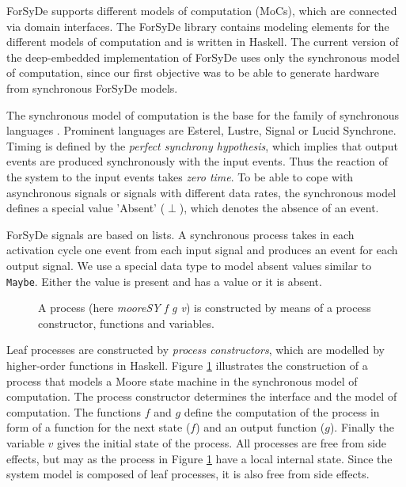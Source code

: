 ForSyDe supports different models of computation (MoCs), which are connected via domain interfaces. The ForSyDe library contains modeling elements for the different models of computation and is written in Haskell. The current version of the deep-embedded implementation of ForSyDe uses only the synchronous model of computation, since our first objective was to be able to generate hardware from synchronous ForSyDe models.

The synchronous model of computation is the base for the family of synchronous languages \cite{BenBer1991}. Prominent languages are Esterel, Lustre, Signal or Lucid Synchrone. Timing is defined by the \emph{perfect synchrony hypothesis}, which implies that output events are produced synchronously with the input events. Thus the reaction of the system to the input events takes \emph{zero time}. To be able to cope with asynchronous signals or signals with different data rates, the synchronous model defines a special value 'Absent' ($\perp$), which denotes the absence of an event.   

ForSyDe signals are based on lists. A synchronous process takes in each activation cycle one event from each input signal and produces an event for each output signal. We use a special data type to model absent values similar to \texttt{Maybe}. Either the value is present and has a value or it is absent.

\begin{figure}[htb]
  \centering
  \resizebox{\columnwidth}{!}{}
  \caption{A process (here \emph{mooreSY f g v}) is constructed by means of a process constructor, functions and variables.}
  \label{fig:ProcessConstructor}
\end{figure}

Leaf processes are constructed by \emph{process constructors}, which are modelled by higher-order functions in Haskell. Figure \ref{fig:ProcessConstructor} illustrates the construction of a process that models a Moore state machine in the synchronous model of computation. The process constructor determines the interface and the model of computation. The functions $f$ and $g$ define the computation of the process in form of a function for the next state ($f$) and an output function ($g$). Finally the variable $v$ gives the initial state of the process. All processes are free from side effects, but may as the process in Figure \ref{fig:ProcessConstructor} have a local internal state. Since the system model is composed of leaf processes, it is also free from side effects.

